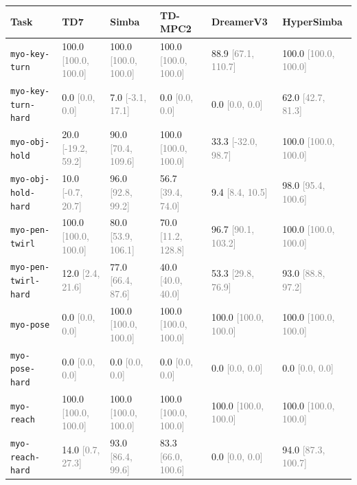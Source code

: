 \begin{tabular}{llllll}
\toprule
\textbf{Task} & \textbf{TD7} & \textbf{Simba} & \textbf{TD-MPC2} & \textbf{DreamerV3} & \textbf{HyperSimba} \\
\midrule
\texttt{myo-key-turn} & 100.0 \textcolor{gray}{[100.0, 100.0]} & 100.0 \textcolor{gray}{[100.0, 100.0]} & 100.0 \textcolor{gray}{[100.0, 100.0]} & 88.9 \textcolor{gray}{[67.1, 110.7]} & 100.0 \textcolor{gray}{[100.0, 100.0]} \\
\texttt{myo-key-turn-hard} & 0.0 \textcolor{gray}{[0.0, 0.0]} & 7.0 \textcolor{gray}{[-3.1, 17.1]} & 0.0 \textcolor{gray}{[0.0, 0.0]} & 0.0 \textcolor{gray}{[0.0, 0.0]} & 62.0 \textcolor{gray}{[42.7, 81.3]} \\
\texttt{myo-obj-hold} & 20.0 \textcolor{gray}{[-19.2, 59.2]} & 90.0 \textcolor{gray}{[70.4, 109.6]} & 100.0 \textcolor{gray}{[100.0, 100.0]} & 33.3 \textcolor{gray}{[-32.0, 98.7]} & 100.0 \textcolor{gray}{[100.0, 100.0]} \\
\texttt{myo-obj-hold-hard} & 10.0 \textcolor{gray}{[-0.7, 20.7]} & 96.0 \textcolor{gray}{[92.8, 99.2]} & 56.7 \textcolor{gray}{[39.4, 74.0]} & 9.4 \textcolor{gray}{[8.4, 10.5]} & 98.0 \textcolor{gray}{[95.4, 100.6]} \\
\texttt{myo-pen-twirl} & 100.0 \textcolor{gray}{[100.0, 100.0]} & 80.0 \textcolor{gray}{[53.9, 106.1]} & 70.0 \textcolor{gray}{[11.2, 128.8]} & 96.7 \textcolor{gray}{[90.1, 103.2]} & 100.0 \textcolor{gray}{[100.0, 100.0]} \\
\texttt{myo-pen-twirl-hard} & 12.0 \textcolor{gray}{[2.4, 21.6]} & 77.0 \textcolor{gray}{[66.4, 87.6]} & 40.0 \textcolor{gray}{[40.0, 40.0]} & 53.3 \textcolor{gray}{[29.8, 76.9]} & 93.0 \textcolor{gray}{[88.8, 97.2]} \\
\texttt{myo-pose} & 0.0 \textcolor{gray}{[0.0, 0.0]} & 100.0 \textcolor{gray}{[100.0, 100.0]} & 100.0 \textcolor{gray}{[100.0, 100.0]} & 100.0 \textcolor{gray}{[100.0, 100.0]} & 100.0 \textcolor{gray}{[100.0, 100.0]} \\
\texttt{myo-pose-hard} & 0.0 \textcolor{gray}{[0.0, 0.0]} & 0.0 \textcolor{gray}{[0.0, 0.0]} & 0.0 \textcolor{gray}{[0.0, 0.0]} & 0.0 \textcolor{gray}{[0.0, 0.0]} & 0.0 \textcolor{gray}{[0.0, 0.0]} \\
\texttt{myo-reach} & 100.0 \textcolor{gray}{[100.0, 100.0]} & 100.0 \textcolor{gray}{[100.0, 100.0]} & 100.0 \textcolor{gray}{[100.0, 100.0]} & 100.0 \textcolor{gray}{[100.0, 100.0]} & 100.0 \textcolor{gray}{[100.0, 100.0]} \\
\texttt{myo-reach-hard} & 14.0 \textcolor{gray}{[0.7, 27.3]} & 93.0 \textcolor{gray}{[86.4, 99.6]} & 83.3 \textcolor{gray}{[66.0, 100.6]} & 0.0 \textcolor{gray}{[0.0, 0.0]} & 94.0 \textcolor{gray}{[87.3, 100.7]} \\

\end{tabular}
